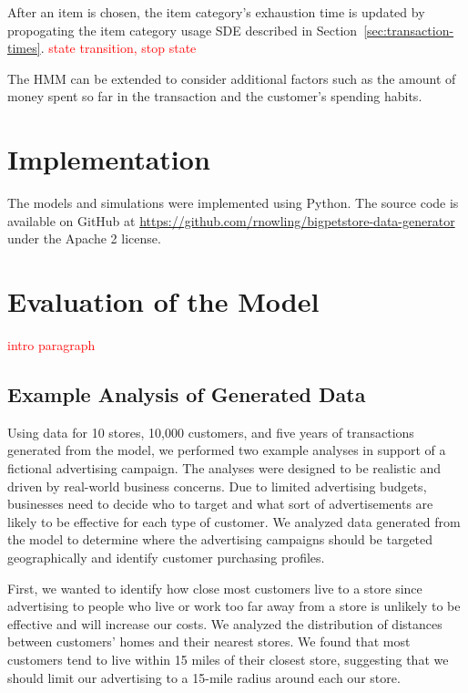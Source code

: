 \documentclass[conference]{IEEEtran}
\begin{document}
After an item is chosen, the item category's exhaustion time is updated by propogating the item category usage SDE described in Section~\ref{sec:transaction-times}. \textcolor{red}{state transition, stop state}

The HMM can be extended to consider additional factors such as the amount of money spent so far in the transaction and the customer's spending habits.

\section{Implementation}
The models and simulations were implemented using Python. The source code is available on GitHub \cite{GitHub} at \url{https://github.com/rnowling/bigpetstore-data-generator} under the Apache 2 license.

\section{Evaluation of the Model}

\textcolor{red}{intro paragraph}

\subsection{Example Analysis of Generated Data}
Using data for 10 stores, 10,000 customers, and five years of transactions generated from the model, we performed two example analyses in support of a fictional advertising campaign. The analyses were designed to be realistic and driven by real-world business concerns.  Due to limited advertising budgets, businesses need to decide who to target and what sort of advertisements are likely to be effective for each type of customer.  We analyzed data generated from the model to determine where the advertising campaigns should be targeted geographically and identify customer purchasing profiles.

First, we wanted to identify how close most customers live to a store since advertising to people who live or work too far away from a store is unlikely to be effective and will increase our costs. We analyzed the distribution of distances between customers' homes and their nearest stores.  We found that most customers tend to live within 15 miles of their closest store, suggesting that we should limit our advertising to a 15-mile radius around each our store.
\end{document}
